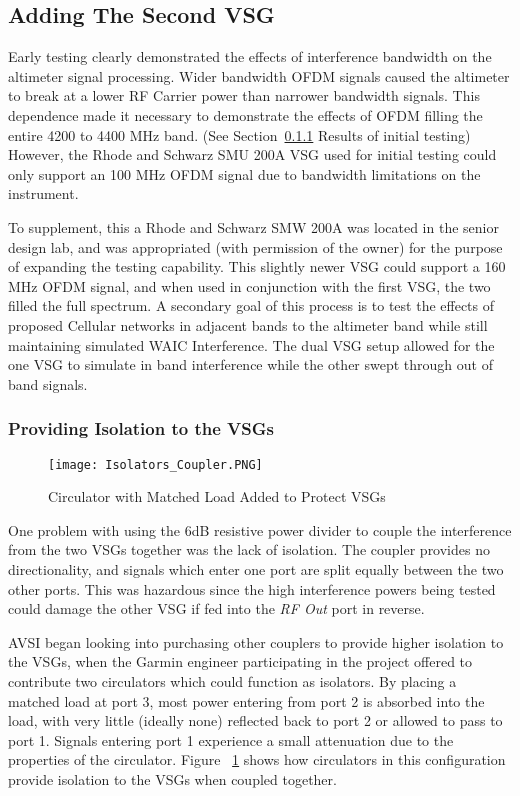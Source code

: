 \subsection{Adding The Second VSG}
Early testing clearly demonstrated the effects of interference bandwidth on the altimeter signal processing. Wider bandwidth OFDM signals caused the altimeter to break at a lower RF Carrier power than narrower bandwidth signals. This dependence made it necessary to demonstrate the effects of OFDM filling the entire 4200 to 4400 MHz band. (See Section~\ref{} Results of initial testing) However, the Rhode and Schwarz SMU 200A VSG used for initial testing could only support an 100 MHz OFDM signal due to bandwidth limitations on the instrument.  

To supplement, this a Rhode and Schwarz SMW 200A was located in the senior design lab, and was appropriated (with permission of the owner) for the purpose of expanding the testing capability. This slightly newer VSG could support a 160 MHz OFDM signal, and when used in conjunction with the first VSG, the two filled the full spectrum. A secondary goal of this process is to test the effects of proposed Cellular networks in adjacent bands to the altimeter band while still maintaining simulated WAIC Interference. The dual VSG setup allowed for the one VSG to simulate in band interference while the other swept through out of band signals. 

\subsubsection{Providing Isolation to the VSGs}
\begin{figure}[ht]
\centering
\texttt{[image: Isolators\_Coupler.PNG]}
\caption{Circulator with Matched Load Added to Protect VSGs}

\label{fig:circulator}
\end{figure}
One problem with using the 6dB resistive power divider to couple the interference from the two VSGs together was the lack of isolation. The coupler provides no directionality, and signals which enter one port are split equally between the two other ports. This was hazardous since the high interference powers being tested could damage the other VSG if fed into the \textit{RF Out} port in reverse. 

AVSI began looking into purchasing other couplers to provide higher isolation to the VSGs, when the Garmin engineer participating in the project offered to contribute two circulators which could function as isolators. By placing a matched load at port 3, most power entering from port 2 is absorbed into the load, with very little (ideally none) reflected back to port 2 or allowed to pass to port 1. Signals entering port 1 experience a small attenuation due to the properties of the circulator. Figure ~\ref{fig:circulator} shows how circulators in this configuration provide isolation to the VSGs when coupled together. 

